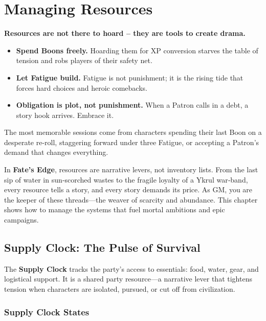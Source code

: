 \chapter{Managing Resources}
\label{ch:gm-resources}

\begin{tcolorbox}[colback=blue!5!white, colframe=blue!75!black, title={Philosophy of Resources}]
\textbf{Resources are not there to hoard – they are tools to create drama.}

\begin{itemize}
  \item \textbf{Spend Boons freely.} Hoarding them for XP conversion starves the table of tension and robs players of their safety net.
  \item \textbf{Let Fatigue build.} Fatigue is not punishment; it is the rising tide that forces hard choices and heroic comebacks.
  \item \textbf{Obligation is plot, not punishment.} When a Patron calls in a debt, a story hook arrives. Embrace it.
\end{itemize}

The most memorable sessions come from characters spending their last Boon on a desperate re-roll, staggering forward under three Fatigue, or accepting a Patron’s demand that changes everything.
\end{tcolorbox}

In \textbf{Fate's Edge}, resources are narrative levers, not inventory lists. From the last sip of water in sun‑scorched wastes to the fragile loyalty of a Ykrul war‑band, every resource tells a story, and every story demands its price. As GM, you are the keeper of these threads—the weaver of scarcity and abundance. This chapter shows how to manage the systems that fuel mortal ambitions and epic campaigns.

\section{Supply Clock: The Pulse of Survival}
\label{sec:supply-clock}

The \textbf{Supply Clock} tracks the party’s access to essentials: food, water, gear, and logistical support. It is a shared party resource—a narrative lever that tightens tension when characters are isolated, pursued, or cut off from civilization.

\subsection{Supply Clock States}
\label{subsec:supply-states}

